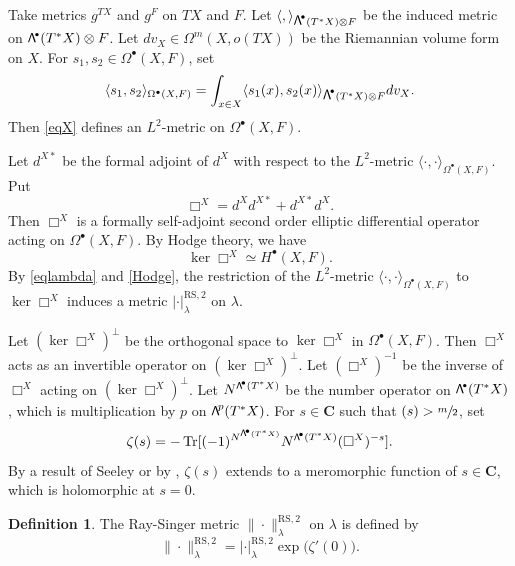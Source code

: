 \documentclass[11pt]{article}
\numberwithin{equation}{section}
\newcommand{\sbullet}{{\scriptscriptstyle\bullet}}
\newcommand\bw[1]{{\hbox{\large$\mathsf{\Lambda}$}^{\!#1}}}
\newcommand\sbw[1]{{\hbox{$\scriptstyle\mathsf{\Lambda}$}^{\!#1}}}
\newcommand{\RS}{\mathrm{RS}}
\theoremstyle{plain}
\theoremstyle{definition}
\newtheorem{defin}[lem]{Definition}
\theoremstyle{remark}
\newcommand{\bC}{\mathbf{C}}
\DeclareMathOperator{\Tr}{Tr}
\let\Re\relax
\DeclareMathOperator{\Re}{Re}
\let\<\langle
\let\>\rangle
\begin{document}
Take metrics $g^{TX}$ and $g^{F}$ on $TX$ and $F$. Let
$\<,\>_{\bw{\sbullet}(T^{*}X)\otimes F}$ be the induced metric on
$\bw{\sbullet}(T^{*}X)\otimes F$. Let $dv_{X}\in
\Omega^{m}(X,o(TX))$ be the Riemannian volume form on $X$.
For $s_{1},s_{2}\in \Omega^{\sbullet}(X,F)$, set
\begin{equation}\label{eqX}
\<s_{1},s_{2}\>_{\Omega^{\sbullet}(X,F)}=\int_{x\in X}\<s_{1}(x),s_{2}(x)\>_{\bw{\sbullet}(T^{*}X)\otimes
F}dv_{X}.
\end{equation}
Then \eqref{eqX} defines an $L^{2}$-metric on $\Omega^{\sbullet}(X,F)$.

Let $d^{X*}$ be the formal adjoint of $d^{X}$ with respect to the
$L^{2}$-metric $\<\cdot,\cdot\>_{\Omega^{\sbullet}(X,F)}$. Put
\begin{equation*}
\Box^{X}=d^{X}d^{X*}+d^{X*}d^{X}.
\end{equation*}
Then $\Box^{X}$ is a formally self-adjoint second order elliptic differential
operator acting on $\Omega^{\sbullet}(X,F)$. By Hodge theory, we have
\begin{equation}\label{Hodge}
\ker \Box^{X}\simeq H^{\sbullet}(X,F).
\end{equation}
By \eqref{eqlambda} and \eqref{Hodge}, the restriction of the $L^{2}$-metric $\<\cdot,\cdot\>_{\Omega^{\sbullet}(X,F)}$ to $\ker
\Box^{X}$ induces a metric $|\cdot|^{\RS,2}_{\lambda}$ on $\lambda$.

Let $(\ker \Box^X)^{\bot}$ be the orthogonal space to $\ker \Box^X$
in $\Omega^{\sbullet}(X,F)$. Then $\Box^{X}$ acts as an invertible
operator on $(\ker\Box^{X})^{\bot}$. Let $(\Box^{X})^{-1}$ be the
inverse of $\Box^{X}$ acting on $(\ker\Box^X)^{\bot}$. Let
$N^{\sbw{\sbullet}(T^{*}X)}$ be the number operator on
$\bw{\sbullet}(T^{*}X)$, which is multiplication by $p$ on
$\bw{p}(T^{*}X)$. For $s\in \bC$ such that $\Re(s)>\sfrac{m}{2}$, set
\begin{equation*}
\zeta(s)=-\Tr[(-1)^{N^{\sbw{\sbullet}(T^{*}X)}}N^{\sbw{\sbullet}(T^{*}X)}(\Box^{X})^{-s}].
\end{equation*}
By a result of Seeley \cite{Seeley66} or by \cite[Th.\,7.10]{BZ92}, $\zeta(s)$ extends to a meromorphic function
of $s\in \bC$, which is holomorphic at $s=0$.

\begin{defin}
The Ray-Singer metric $\|{\cdot}\|^{\RS,2}_{\lambda}$ on
$\lambda$ is defined by
\begin{equation*}
\|{\cdot}\|^{\RS,2}_{\lambda}=|\cdot|^{\RS,2}_{\lambda}\exp\big(\zeta'(0)\big).
\end{equation*}
\end{defin}
\end{document}
